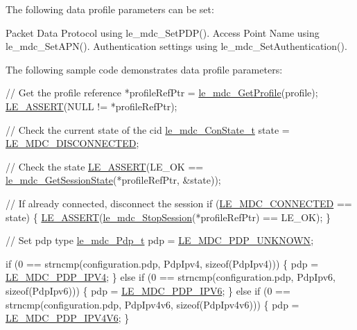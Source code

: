 The following data profile parameters can be set\+: \begin{DoxyVerb}Packet Data Protocol using le_mdc_SetPDP().
Access Point Name using le_mdc_SetAPN().
Authentication settings using le_mdc_SetAuthentication().
\end{DoxyVerb}


The following sample code demonstrates data profile parameters\+: 
\begin{DoxyCodeInclude}

    \textcolor{comment}{// Get the profile reference}
    *profileRefPtr = \hyperlink{le__mdc__interface_8h_a638b693cd5f644fa5c24f81e1e36483c}{le\_mdc\_GetProfile}(profile);
    \hyperlink{le__log_8h_ac0dbbef91dc0fed449d0092ff0557b39}{LE\_ASSERT}(NULL != *profileRefPtr);

    \textcolor{comment}{// Check the current state of the cid}
    \hyperlink{le__mdc__interface_8h_a0727e543d0394422963c8d6297947333}{le\_mdc\_ConState\_t} state = \hyperlink{le__mdc__interface_8h_a0727e543d0394422963c8d6297947333a6d11ee963528c79d73a269eb85202ba7}{LE\_MDC\_DISCONNECTED};

    \textcolor{comment}{// Check the state}
    \hyperlink{le__log_8h_ac0dbbef91dc0fed449d0092ff0557b39}{LE\_ASSERT}(LE\_OK == \hyperlink{le__mdc__interface_8h_add91c364e8b3e4e82a0ce64e480c016b}{le\_mdc\_GetSessionState}(*profileRefPtr, &state));

    \textcolor{comment}{// If already connected, disconnect the session}
    \textcolor{keywordflow}{if} (\hyperlink{le__mdc__interface_8h_a0727e543d0394422963c8d6297947333a0a8a2113935b881b76c59b94cf7223b8}{LE\_MDC\_CONNECTED} == state)
    \{
        \hyperlink{le__log_8h_ac0dbbef91dc0fed449d0092ff0557b39}{LE\_ASSERT}(\hyperlink{le__mdc__interface_8h_a53453f85065c3cace0922150b7e3d869}{le\_mdc\_StopSession}(*profileRefPtr) == LE\_OK);
    \}

    \textcolor{comment}{// Set pdp type}
    \hyperlink{le__mdc__interface_8h_a85721ec6046140c2f87c23f877dce247}{le\_mdc\_Pdp\_t} pdp = \hyperlink{le__mdc__interface_8h_a85721ec6046140c2f87c23f877dce247a590fd5c933c3751e42053f996d530987}{LE\_MDC\_PDP\_UNKNOWN};

    \textcolor{keywordflow}{if} (0 == strncmp(configuration.pdp, PdpIpv4, \textcolor{keyword}{sizeof}(PdpIpv4)))
    \{
        pdp = \hyperlink{le__mdc__interface_8h_a85721ec6046140c2f87c23f877dce247af550adf5bcecb680294f92f28496a830}{LE\_MDC\_PDP\_IPV4};
    \}
    \textcolor{keywordflow}{else} \textcolor{keywordflow}{if} (0 == strncmp(configuration.pdp, PdpIpv6, \textcolor{keyword}{sizeof}(PdpIpv6)))
    \{
        pdp = \hyperlink{le__mdc__interface_8h_a85721ec6046140c2f87c23f877dce247ac2d2a34bad2d18be1ea8facef0effad0}{LE\_MDC\_PDP\_IPV6};
    \}
    \textcolor{keywordflow}{else} \textcolor{keywordflow}{if} (0 == strncmp(configuration.pdp, PdpIpv4v6, \textcolor{keyword}{sizeof}(PdpIpv4v6)))
    \{
        pdp = \hyperlink{le__mdc__interface_8h_a85721ec6046140c2f87c23f877dce247a4427db8ba7a89ebf66c7b62eacfc8275}{LE\_MDC\_PDP\_IPV4V6};
    \}


\end{DoxyCodeInclude}
